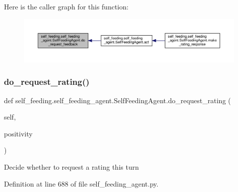 Here is the caller graph for this function\+:
\nopagebreak
\begin{figure}[H]
\begin{center}
\leavevmode
\includegraphics[width=350pt]{classself__feeding_1_1self__feeding__agent_1_1SelfFeedingAgent_a6d28a8c3f063bde4cd98cfb209821bf5_icgraph}
\end{center}
\end{figure}
\mbox{\label{classself__feeding_1_1self__feeding__agent_1_1SelfFeedingAgent_ab0ccbaba9de0874d235a2ce14dd8ead3}} 
\subsubsection{\texorpdfstring{do\+\_\+request\+\_\+rating()}{do\_request\_rating()}}
{\footnotesize\ttfamily def self\+\_\+feeding.\+self\+\_\+feeding\+\_\+agent.\+Self\+Feeding\+Agent.\+do\+\_\+request\+\_\+rating (\begin{DoxyParamCaption}\item[{}]{self,  }\item[{}]{positivity }\end{DoxyParamCaption})}

\begin{DoxyVerb}Decide whether to request a rating this turn\end{DoxyVerb}
 

Definition at line 688 of file self\+\_\+feeding\+\_\+agent.\+py.



